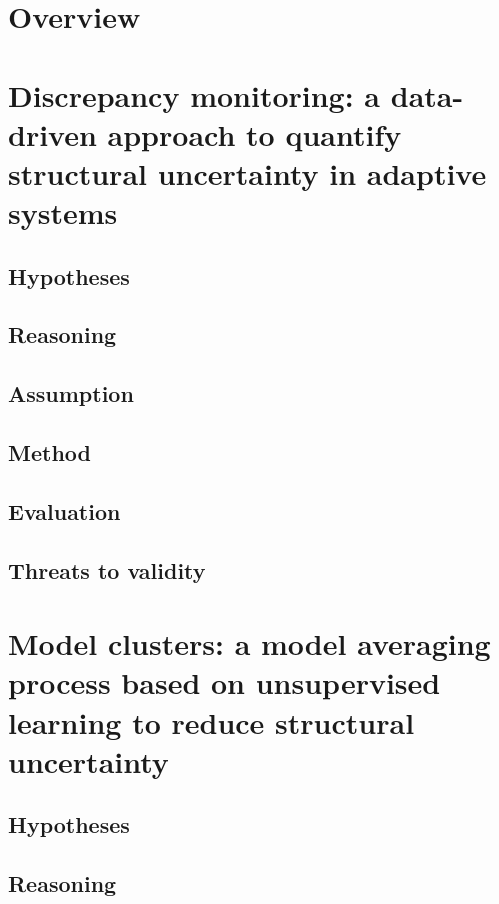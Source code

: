 \section{Overview}

\section{Discrepancy monitoring: a data-driven approach to quantify structural uncertainty in adaptive systems}\label{sec:discrep}

\subsection{Hypotheses}

\subsection{Reasoning}

\subsection{Assumption}

\subsection{Method}

\subsection{Evaluation}

\subsection{Threats to validity}

\section{Model clusters: a model averaging process based on unsupervised learning to reduce structural uncertainty}\label{sec:modaverage}

\subsection{Hypotheses}

\subsection{Reasoning}

